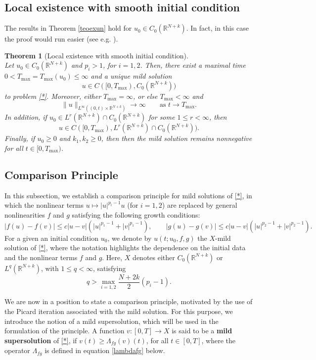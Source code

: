 \documentclass[a4,psfig,english,12pt,epsf,portrait]{article}
\newtheorem{theorem}{Theorem}[section]
\numberwithin{equation}{section}
\def\R{{\mathbb {R}}}
\def\R{\mathbb{R}}
\begin{document}
\subsection{Local existence with smooth initial condition}

The results in Theorem \ref{teoexun} hold for $u_0\in C_0(\R^{N+k})$. In fact, in this case the proof would run easier (see e.g. \cite{CDW, Fino-Ki-12}).
\begin{theorem}[Local existence with smooth initial condition]\label{T0+}${}$\\
	Let $u_0\in C_0(\mathbb{R}^{N+k})$ and $p_i>1$, for $i=1,2$. Then, there exist a maximal
	time $0<T_{\max}=T_{\max}(u_0)\leq\infty$ and a unique mild solution 
	$$u\in C([0,T_{\max}),C_0(\mathbb{R}^{N+k}))$$
	to problem \eqref{*}. Moreover, either $T_{\max}=\infty$, or else $T_{\max}<\infty$ and 
	$$\|u\|_{L^\infty((0,t)\times\mathbb{R}^{N+k})}\rightarrow\infty\qquad \mathrm{as}\,\, t\rightarrow T_{\max}.$$ In addition, if $u_0\in L^r(\mathbb{R}^{N+k})\cap C_0(\mathbb{R}^{N+k})$ for some $1\leq r<\infty$, then 
	$$u\in C([0,T_{\max}),L^r(\mathbb{R}^{N+k})\cap C_0(\mathbb{R}^{N+k})).$$
	Finally, if $u_0\geq0$ and $k_1,k_2\geq0$, then then the mild solution remains nonnegative for all $t\in[0,T_{\max})$.
\end{theorem}

\subsection{Comparison Principle}\label{comparisonp}


In this subsection, we establish a comparison principle for mild solutions of \eqref{*}, in which the nonlinear terms $u\mapsto |u|^{p_i-1}u$ (for $i=1,2$) are replaced by general nonlinearities $f$ and $g$ satisfying the following growth conditions: 
\begin{equation}\label{growth1}
	|f(u)-f(v)| \leq c|u-v|(|u|^{p_1-1} + |v|^{p_1-1}),\quad\quad |g(u)-g(v)| \leq c|u-v|(|u|^{p_2-1} + |v|^{p_2-1}).
\end{equation}
For a given an initial condition $u_0$, we denote by $u(t;u_0,f,g)$ the $X$-mild solution of \eqref{*}, where the notation highlights the dependence on the initial data and the nonlinear terms $f$ and $g$. Here, $X$ denotes either $C_0(\mathbb{R}^{N+k})$ or $L^q(\mathbb{R}^{N+k})$, with $1\leq q <\infty$, satisfying
$$q>\max\limits_{i=1,2}\frac{N+2k}{2}(p_i-1).$$


We are now in a position to state a comparison principle, motivated by the use of the Picard iteration associated with the mild solution. For this purpose, we introduce the notion of a mild supersolution, which will be used in the formulation of the principle. A function $v:[0,T]\to X$ is said to be a {\bf mild supersolution} of \eqref{*}, if $v(t) \geq \Lambda_{fg}(v)(t)$, for all $t\in[0,T]$, where the operator $\Lambda_{fg}$ is defined in equation \eqref{lambdafg} below.
\end{document}
